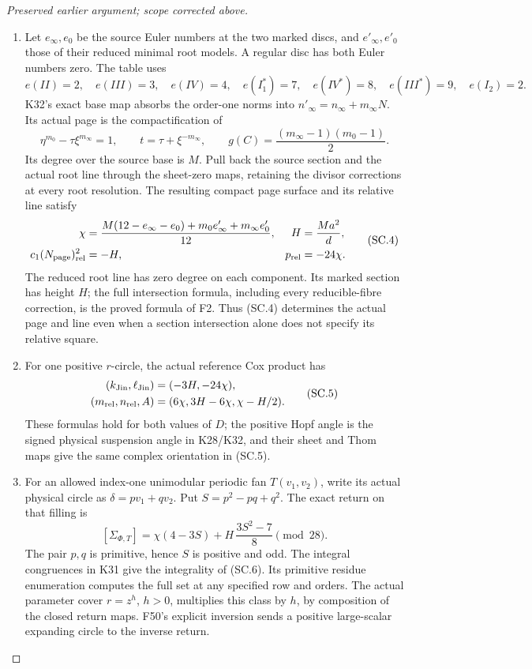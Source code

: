 \begin{proof}[Preserved earlier argument; scope corrected above]
\begin{enumerate}[label=\arabic*.]
\item Let \(e_\infty,e_0\) be the source Euler numbers at the two
marked discs, and \(e'_\infty,e'_0\) those of their reduced
minimal root models. A regular disc has both Euler numbers
zero. The table uses
\[
 e(II)=2,\quad e(III)=3,\quad e(IV)=4,\quad
 e(I_1^*)=7,\quad e(IV^*)=8,\quad e(III^*)=9,
 \quad e(I_2)=2.
\]
K32's exact base map absorbs the order-one norms into
\(n'_\infty=n_\infty+m_\infty N\). Its actual page is the
compactification of
\[
 \eta^{m_0}-\tau\xi^{m_\infty}=1,\qquad
 t=\tau+\xi^{-m_\infty},\qquad
 g(C)=\frac{(m_\infty-1)(m_0-1)}2.               \tag{SC.3}
\]
Its degree over the source base is \(M\). Pull back the
source section and the actual root line through the
sheet-zero maps, retaining the divisor corrections
at every root resolution. The resulting compact page
surface and its relative line satisfy
\[
 \begin{aligned}
 \chi&=\frac{M(12-e_\infty-e_0)
                 +m_0e'_\infty+m_\infty e'_0}{12},
 &H&=\frac{Ma^2}{d},\\
 c_1(N_{\rm page})_{\rm rel}^2&=-H,
 &p_{\rm rel}&=-24\chi.
 \end{aligned}                                  \tag{SC.4}
\]
The reduced root line has zero degree on each component.
Its marked section has height \(H\); the full intersection
formula, including every reducible-fibre correction,
is the proved formula of F2. Thus (SC.4) determines the
actual page and line even when a section intersection
alone does not specify its relative square.

\item For one positive \(r\)-circle, the actual reference Cox
product has
\[
 \begin{split}
 (k_{\rm Jin},\ell_{\rm Jin})&=(-3H,-24\chi),\\
 (m_{\rm rel},n_{\rm rel},A)&=
           (6\chi,3H-6\chi,\chi-H/2).
 \end{split}                                   \tag{SC.5}
\]
These formulas hold for both values of \(D\); the positive
Hopf angle is the signed physical suspension angle in
K28/K32, and their sheet and Thom maps give the same
complex orientation in (SC.5).

\item For an allowed index-one unimodular periodic fan
\(T(v_1,v_2)\), write its actual physical circle as
\(\delta=pv_1+qv_2\). Put \(S=p^2-pq+q^2\).
The exact return on that filling is
\[
 [\Sigma_{\Phi,T}]
       =\chi(4-3S)+H\,\frac{3S^2-7}{8}
                   \pmod {28}.                 \tag{SC.6}
\]
The pair \(p,q\) is primitive, hence \(S\) is positive
and odd. The integral congruences in K31 give the
integrality of (SC.6). Its primitive residue enumeration
computes the full set at any specified row and orders.
The actual parameter cover \(r=z^h\), \(h>0\), multiplies
this class by \(h\), by composition of the closed
return maps. F50's explicit inversion sends a positive
large-scalar expanding circle to the inverse return.


\end{enumerate}
\end{proof}
